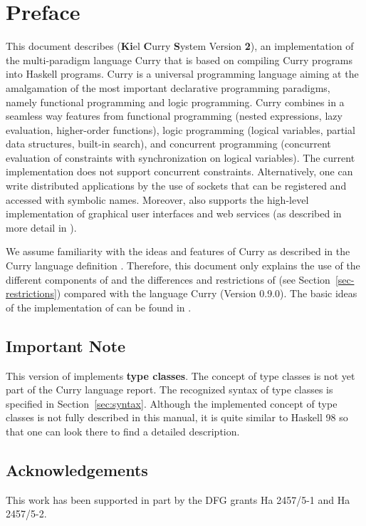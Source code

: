 \section*{Preface}

This document describes \CYS (\textbf{Ki}el \textbf{C}urry \textbf{S}ystem
Version \textbf{2}),
an implementation of the multi-paradigm language Curry
\cite{Hanus97POPL,Hanus16Curry} that is
based on compiling Curry programs into Haskell programs.
Curry is a universal programming language aiming at the amalgamation
of the most important declarative programming paradigms,
namely functional programming and logic programming.
Curry combines in a seamless way features from functional programming
(nested expressions, lazy evaluation, higher-order functions),
logic programming (logical variables, partial data structures,
built-in search), and concurrent programming (concurrent evaluation
of constraints with synchronization on logical variables).
The current \CYS implementation does not support concurrent
constraints. Alternatively, one can write distributed applications
by the use of sockets that can be registered and accessed
with symbolic names.
Moreover, \CYS also supports
the high-level implementation of
graphical user interfaces and web services
(as described in more detail in
\cite{Hanus99PPDP,Hanus00PADL,Hanus01PADL,Hanus06PPDP}).

We assume familiarity with the ideas and features
of Curry as described in the Curry language definition \cite{Hanus16Curry}.
Therefore, this document only explains the use of the different
components of \CYS
and the differences and restrictions of \CYS
(see Section~\ref{sec-restrictions})
compared with the language Curry (Version 0.9.0).
%
The basic ideas of the implementation of \CYS
can be found in
\cite{BrasselHanusPeemoellerReck11,BrasselHanusPeemoellerReck13PADL}.

\bigskip

\subsection*{Important Note}

This version of \CYS implements \textbf{type classes}.
The concept of type classes is not yet part of the Curry language report.
The recognized syntax of type classes is specified in
Section~\ref{sec:syntax}.
Although the implemented concept of type classes
is not fully described in this manual,
it is quite similar to Haskell 98 \cite{PeytonJones03Haskell}
so that one can look there to find a detailed description.

\bigskip

\subsection*{Acknowledgements}

This work has been supported in part by the
DFG grants Ha 2457/5-1 and Ha 2457/5-2.
